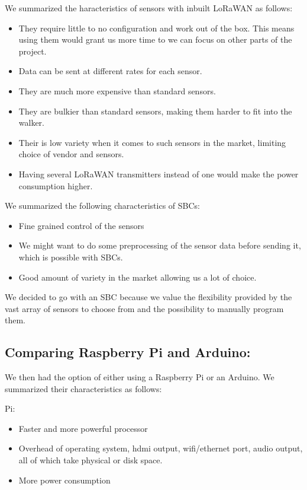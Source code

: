 We summarized the haracteristics of sensors with inbuilt LoRaWAN as follows:
\begin{itemize}
	\item They require little to no configuration and work out of the box. This means using them would grant us more time to we can focus on other parts of the project.
	\item Data can be sent at different rates for each sensor.
	\item They are much more expensive than standard sensors.
	\item They are bulkier than standard sensors, making them harder to fit into the walker.
	\item Their is low variety when it comes to such sensors in the market, limiting choice of vendor and sensors.
	\item Having several LoRaWAN transmitters instead of one would make the power consumption higher.
\end{itemize}


We summarized the following characteristics of SBCs:
\begin{itemize}
	\item Fine grained control of the sensors
	\item We might want to do some preprocessing of the sensor data before sending it, which is possible with SBCs.
	\item Good amount of variety in the market allowing us a lot of choice.
\end{itemize}

We decided to go with an SBC because we value the flexibility provided by the vast array of sensors to choose from and the possibility to manually program them.



\subsection{Comparing Raspberry Pi and Arduino:}

We then had the option of either using a Raspberry Pi or an Arduino. We summarized their characteristics as follows:

Pi:
\begin{itemize}
	\item Faster and more powerful processor
	\item Overhead of operating system, hdmi output, wifi/ethernet port, audio output, all of which take physical or disk space.
	\item More power consumption
\end{itemize}

